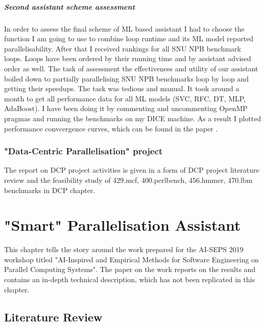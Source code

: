 \documentclass[10pt,a4paper]{report}
\begin{document}
\paragraph{Second assistant scheme assessment}
\quad In order to assess the final scheme of ML based assistant I had to choose the function I am going to use to combine loop runtime and its ML model reported parallelisability. After that I received rankings for all SNU NPB benchmark loops. Loops have been ordered by their running time and by assistant advised order as well. The task of assessment the effectiveness and utility of our assistant boiled down to partially parallelising SNU NPB benchmarks loop by loop and getting their speedups. The task was tedious and manual. It took around a month to get all performance data for all ML models (SVC, RFC, DT, MLP, AdaBoost). I have been doing it by commenting and uncommenting OpenMP pragmas and running the benchmarks on my DICE machine. As a result I plotted performance convcergence curves, which can be found in the paper \cite{aiseps}.  

\subsection{"Data-Centric Parallelisation" project}
\quad The report on DCP project activities is given in a form of DCP project literature review and the feasibility study of 429.mcf, 400.perlbench, 456.hmmer, 470.lbm benchmarks in DCP chapter.

\chapter{"Smart" Parallelisation Assistant}
\label{chapter_ml_assistant}
\quad This chapter tells the story around the work \cite{aiseps} prepared for the AI-SEPS 2019 workshop titled "AI-Inspired and Empirical Methods for Software Engineering on Parallel Computing Systems". The paper on the work \cite{aiseps} reports on the results and contains an in-depth technical description, which has not been replicated in this chapter.

\section{Literature Review}
\end{document}
